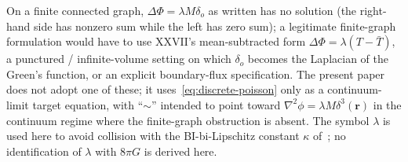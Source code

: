 \documentclass[12pt]{article}
\theoremstyle{definition}
\theoremstyle{remark}
\begin{document}
On a finite connected graph, $\Delta \Phi = \lambda M \delta_o$ as written has no solution (the right-hand side has nonzero sum while the left has zero sum); a legitimate finite-graph formulation would have to use XXVII's mean-subtracted form $\Delta \Phi = \lambda(T - \bar T)$, a punctured / infinite-volume setting on which $\delta_o$ becomes the Laplacian of the Green's function, or an explicit boundary-flux specification. The present paper does not adopt one of these; it uses~\eqref{eq:discrete-poisson} only as a continuum-limit target equation, with ``$\sim$'' intended to point toward $\nabla^2 \phi = \lambda M \delta^3(\mathbf{r})$ in the continuum regime where the finite-graph obstruction is absent. The symbol $\lambda$ is used here to avoid collision with the BI-bi-Lipschitz constant $\kappa$ of~\citep{SmartXL}; no identification of $\lambda$ with $8\pi G$ is derived here.
\end{document}
